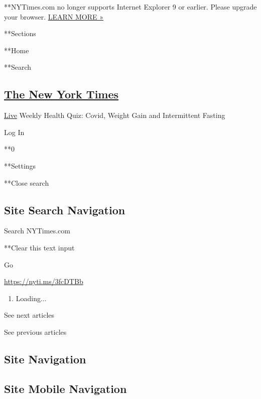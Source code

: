  **NYTimes.com no longer supports Internet Explorer 9 or earlier. Please
upgrade your browser.
\href{http://www.nytimes3xbfgragh.onion/content/help/site/ie9-support.html}{LEARN
MORE »}

**Sections

**Home

**Search

\hypertarget{the-new-york-times}{%
\subsection{\texorpdfstring{\href{http://www.nytimes3xbfgragh.onion/}{The
New York Times}}{The New York Times}}\label{the-new-york-times}}

 \href{https://www.nytimes3xbfgragh.onion/section/well/live}{Live}
\textbar{}Weekly Health Quiz: Covid, Weight Gain and Intermittent
Fasting

Log In

**0

**Settings

**Close search

\hypertarget{site-search-navigation}{%
\subsection{Site Search Navigation}\label{site-search-navigation}}

Search NYTimes.com

**Clear this text input

Go

\url{https://nyti.ms/3fcDTBb}

\begin{enumerate}
\def\labelenumi{\arabic{enumi}.}
\item
  Loading...
\end{enumerate}

See next articles

See previous articles

\hypertarget{site-navigation}{%
\subsection{Site Navigation}\label{site-navigation}}

\hypertarget{site-mobile-navigation}{%
\subsection{Site Mobile Navigation}\label{site-mobile-navigation}}

